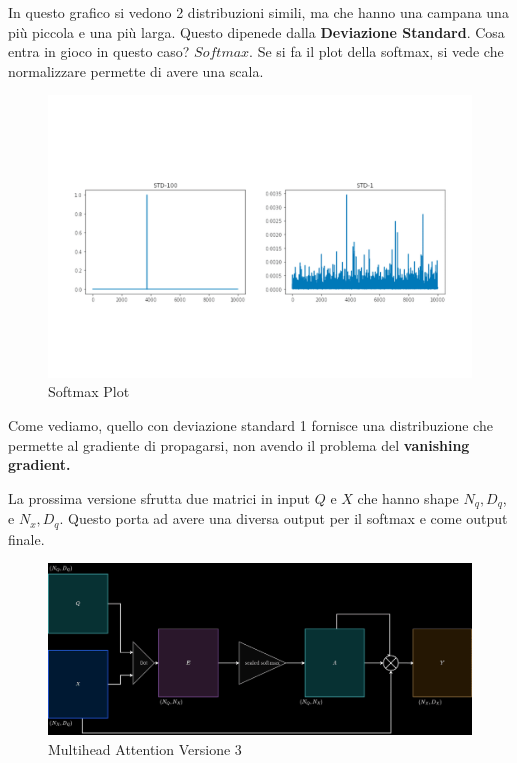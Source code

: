 In questo grafico si vedono 2 distribuzioni simili, ma che hanno una campana
una più piccola e una più larga. Questo dipenede dalla \textbf{Deviazione
    Standard}. Cosa entra in gioco in questo caso? $Softmax$. Se si fa il plot
della softmax, si vede che normalizzare permette di avere una scala.

\begin{figure}[H]
    \includegraphics[width=\textwidth]{images/softmax-std-diagram.png}
    \caption{Softmax Plot}
\end{figure}

Come vediamo, quello con deviazione standard 1 fornisce una distribuzione che
permette al gradiente di propagarsi, non avendo il problema del
\textbf{vanishing gradient.}

La prossima versione sfrutta due matrici in input $Q$ e $X$ che hanno shape
$N_q, D_q$, e $N_x, D_q$. Questo porta ad avere una diversa output per il
softmax e come output finale.

\begin{figure}[H]
    \includegraphics[width=\textwidth]{images/evolution-Version-3.png}
    \caption{Multihead Attention Versione 3}
\end{figure}

